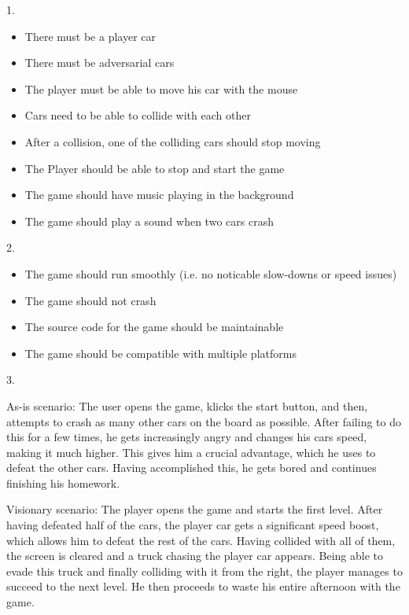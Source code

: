 \documentclass[11pt,a4paper]{article}
\begin{document}
\thispagestyle{empty}
\pagestyle{empty}

1.

\begin{itemize}
\item There must be a player car
\item There must be adversarial cars
\item The player must be able to move his car with the mouse
\item Cars need to be able to collide with each other
\item After a collision, one of the colliding cars should stop moving
\item The Player should be able to stop and start the game
\item The game should have music playing in the background
\item The game should play a sound when two cars crash
\end{itemize}

2.

\begin{itemize}
\item The game should run smoothly (i.e. no noticable slow-downs or speed issues)
\item The game should not crash
\item The source code for the game should be maintainable
\item The game should be compatible with multiple platforms
\end{itemize}

3.

As-is scenario: The user opens the game, klicks the start button, and then,
attempts to crash as many other cars on the board as possible. After failing to
do this for a few times, he gets increasingly angry and changes his cars speed,
making it much higher. This gives him a crucial advantage, which he uses to
defeat the other cars. Having accomplished this, he gets bored and continues
finishing his homework.

\vspace{0.5cm}

Visionary scenario: The player opens the game and starts the first
level. After having defeated half of the cars, the player car gets
a significant speed boost, which allows him to defeat the rest of the
cars. Having collided with all of them, the screen is cleared and a truck
chasing the player car appears. Being able to evade this truck and finally
colliding with it from the right, the player manages to succeed to the
next level. He then proceeds to waste his entire afternoon with the game.
\end{document}
